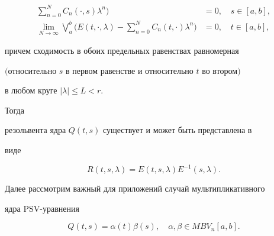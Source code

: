 \begin{thm}
\begin{itemize}
\begin{align*}
\sum_{n=0}^N C_n(\cdot,s)\lambda^n\bigg)&=0,\quad s\in[a,b],\\


%


\lim_{N\to\infty}\bigvee\limits_a^b\bigg(E(t,\cdot,\lambda)-


\sum_{n=0}^N C_n(t,\cdot)\lambda^n\bigg)&=0,\quad t\in[a,b],


\end{align*}


причем сходимость в обоих предельных равенствах равномерная


$($относительно $s$ в первом равенстве и относительно $t$ во втором$)$


в любом круге $|\lambda|\leq L<r.$


\end{itemize}





Тогда


резольвента ядра $Q(t,s)$ существует и может быть представлена в


виде


$$


R(t,s,\lambda)=E(t,s,\lambda)E^{-1}(s,\lambda).


$$


\end{thm}





Далее рассмотрим важный для приложений случай мультипликативного


ядра PSV-уравнения


\begin{equation}\label{f16}


Q(t,s)=\alpha(t)\beta(s),\quad\alpha,\beta\in MBV_n[a,b].


\end{equation}





